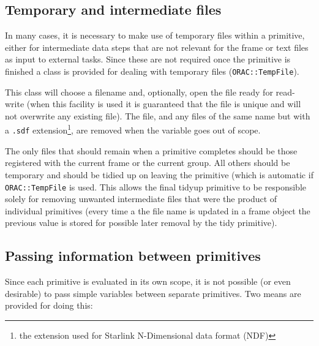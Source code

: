 \documentclass[twoside,11pt]{article}
\renewcommand{\_}{\texttt{\symbol{95}}}
\begin{document}
\subsection{Temporary and intermediate files\label{tempfiles}}

In many cases, it is necessary to make use of temporary files
within a primitive, either for intermediate data steps that are not
relevant for the frame or text files as input to external tasks. Since
these are not required once the primitive is finished a class is
provided for dealing with temporary files (\texttt{ORAC::TempFile}).

This class will choose a filename and, optionally, open the file ready 
for read-write (when this facility is used it is guaranteed that the
file is unique and will not overwrite any existing file). The file,
and any files of the same name but with a \texttt{.sdf}
extension\footnote{the extension used for Starlink N-Dimensional data
format (NDF)}, are removed when the variable goes out of scope.

The only files that should remain when a primitive completes should be
those registered with the current frame or the current group. All
others should be temporary and should be tidied up on leaving the
primitive (which is automatic if \texttt{ORAC::TempFile} is used.
This allows the final tidyup primitive to be responsible solely for
removing unwanted intermediate files that were the product of
individual primitives (every time a the file name is updated in a
frame object the previous value is stored for possible later removal
by the tidy primitive). 

\subsection{Passing information between primitives\label{information_passing}}

Since each primitive is evaluated in its own scope, it is not possible 
(or even desirable) to pass simple variables between separate
primitives. Two means are provided for doing this:
\end{document}
